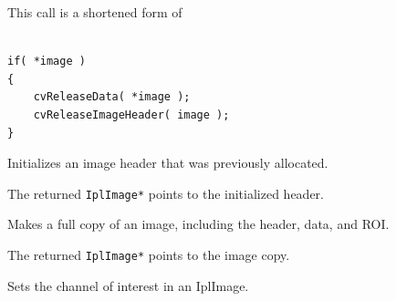 This call is a shortened form of

\begin{lstlisting}

if( *image )
{
    cvReleaseData( *image );
    cvReleaseImageHeader( image );
}

\end{lstlisting}

\label{InitImageHeader}

Initializes an image header that was previously allocated.


\begin{description}
\end{description}

The returned \texttt{IplImage*} points to the initialized header.

\fi

\label{CloneImage}

Makes a full copy of an image, including the header, data, and ROI.


\begin{description}
\end{description}

The returned \texttt{IplImage*} points to the image copy.

\label{SetImageCOI}

Sets the channel of interest in an IplImage.

